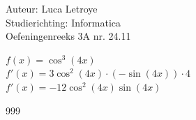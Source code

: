 \documentclass[a4paper]{article}
\begin{document}
  
\noindent \large Auteur: Luca Letroye        \\
\noindent \large Studierichting: Informatica \\
\noindent \large Oefeningenreeks 3A nr. 24.11 \\

\medskip

\normalsize

$f(x) = \cos^3 (4x)$\\

$f'(x) = 3\cos^2(4x) \cdot (-\sin(4x))\cdot 4$\\

$f'(x) = -12\cos^2(4x)\sin(4x)$




\begin{thebibliography}{999}
\end{thebibliography}
\end{document}
